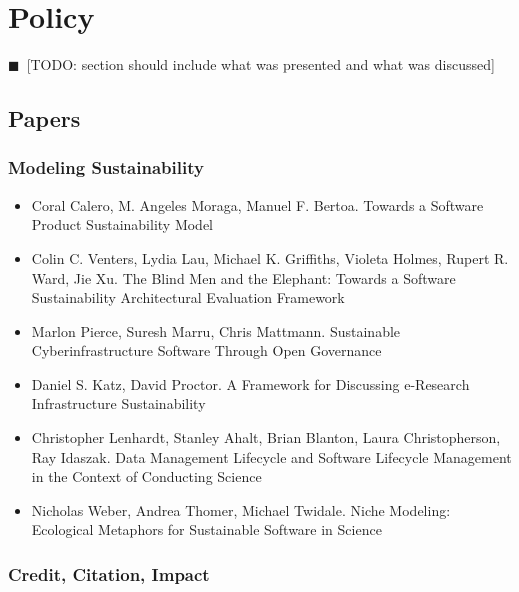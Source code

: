 \documentclass[11pt, oneside]{amsart}
\newcommand{\todo}[1]{{\color{blue}$\blacksquare$~\textsf{[TODO: #1]}}}
\begin{document}
\section{Policy} \label{sec:policy}

\todo{section should include what was presented and what was discussed}

\subsection{Papers}

\subsubsection*{Modeling Sustainability}

\begin{itemize}

\item Coral Calero, M. Angeles Moraga, Manuel F. Bertoa. Towards a Software Product Sustainability Model \cite{Calero_WSSSPE}

\item Colin C. Venters, Lydia Lau, Michael K. Griffiths, Violeta Holmes, Rupert R. Ward, Jie Xu. The Blind Men and the Elephant: Towards a Software Sustainability Architectural Evaluation Framework \cite{Venters_WSSSPE}

\item Marlon Pierce, Suresh Marru, Chris Mattmann. Sustainable Cyberinfrastructure Software Through Open Governance \cite{Pierce_WSSSPE}

\item Daniel S. Katz, David Proctor. A Framework for Discussing e-Research Infrastructure Sustainability \cite{Katz_WSSSPE}

\item Christopher Lenhardt, Stanley Ahalt, Brian Blanton, Laura Christopherson, Ray Idaszak. Data Management Lifecycle and Software Lifecycle Management in the Context of Conducting Science \cite{Lenhardt_WSSSPE}

\item Nicholas Weber, Andrea Thomer, Michael Twidale. Niche Modeling: Ecological Metaphors for Sustainable Software in Science \cite{Weber_WSSSPE}

\end{itemize}

\subsubsection*{Credit, Citation, Impact}
\end{document}
